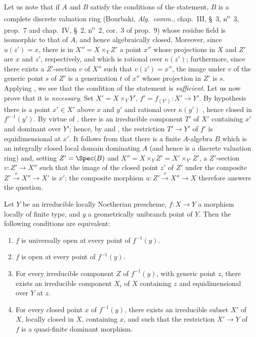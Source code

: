Let us note that if $A$ and $B$ satisfy the conditions of the statement, $B$ is a complete discrete valuation ring (Bourbaki, \emph{Alg.\ comm.}, chap.~III, \S~3, n\textsuperscript{o}~3, prop.~7 and chap.~IV, \S~2, n\textsuperscript{o}~2, cor.~3 of prop.~9) whose residue field is isomorphic to that of $A$, and hence algebraically closed. Moreover, since $u(z')=x$, there is in $X''=X\times_Y Z'$ a point $x''$ whose projections in $X$ and $Z'$ are $x$ and $z'$, respectively, and which is rational over $\kappa(z')$; furthermore, since there exists a $Z'$-section $v$ of $X''$ such that $v(z')=x''$, the image under $v$ of the generic point $s$ of $Z'$ is a generization $t$ of $x''$ whose projection in $Z'$ is $s$. Applying , we see that the condition of the statement is \emph{sufficient}.
Let us now prove that it is \emph{necessary}.
Set $X'=X\times_Y Y'$, $f'=f_{(Y')}:X'\to Y'$.
By hypothesis there is a point $x'\in X'$ above $x$ and $y'$ and rational over $\kappa(y')$ , hence closed in $f'^{-1}(y')$.
By virtue of , there is an irreducible component $T'$ of $X'$ containing $x'$ and dominant over $Y'$; hence, by  and , the restriction $T'\to Y'$ of $f'$ is equidimensional at $x'$.
It follows from  that there is a finite $A$-algebra $B$ which is an integrally closed local domain dominating $A$ (and hence is a discrete valuation ring) and, setting $Z'=\Spec(B)$ and $X''=X\times_Y Z'=X'\times_{Y'}Z'$, a $Z'$-section $v:Z'\to X''$ such that the image of the closed point $z'$ of $Z'$ under the composite $Z'\xrightarrow{v}X''\to X'$ is $x'$; the composite morphism $u:Z'\xrightarrow{v}X''\to X$ therefore answers the question.

\begin{proposition}[14.5.9]
\label{IV.14.5.9}
Let $Y$ be an irreducible locally Noetherian prescheme, $f:X\to Y$ a morphism locally of finite type, and $y$ a geometrically unibranch point of $Y$.
Then the following conditions are equivalent:
\begin{enumerate}[label=\emph{\alph*)}]
  \item $f$ is universally open at every point of $f^{-1}(y)$.
  \item $f$ is open at every point of $f^{-1}(y)$.
  \item For every irreducible component $Z$ of $f^{-1}(y)$, with generic point $z$, there exists an irreducible component $X_i$ of $X$ containing $z$ and equidimensional over $Y$ at $z$.
  \item For every closed point $x$ of $f^{-1}(y)$, there exists an irreducible subset $X'$ of $X$, locally closed in $X$, containing $x$, and such that the restriction $X'\to Y$ of $f$ is a quasi-finite dominant morphism.
\end{enumerate}
\end{proposition}

